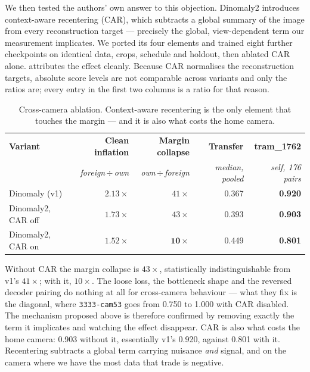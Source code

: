 We then tested the authors' own answer to this objection. Dinomaly2
\cite{Guo_2025_dinomaly2} introduces context-aware recentering (CAR), which
subtracts a global summary of the image from every reconstruction target ---
precisely the global, view-dependent term our measurement implicates. We ported
its four elements and trained eight further checkpoints on identical data,
crops, schedule and holdout, then ablated CAR alone.
 attributes the effect cleanly. Because CAR normalises
the reconstruction targets, absolute score levels are not comparable across
variants and only the ratios are; every entry in the first two columns is a
ratio for that reason.

\begin{table}[t]
\centering
\caption{Cross-camera ablation. Context-aware recentering is the only element
that touches the margin --- and it is also what costs the home camera.}
\label{tab:dinomaly2}
\begin{tabular}{@{}lrrrr@{}}
\toprule
\textbf{Variant} & \textbf{Clean inflation} & \textbf{Margin collapse} &
\textbf{Transfer} & \textbf{tram\_1762} \\
 & \emph{foreign\,$\div$\,own} & \emph{own\,$\div$\,foreign} &
 \emph{median, pooled} & \emph{self, 176 pairs} \\
\midrule
Dinomaly (v1)          & $2.13\times$ & $41\times$ & 0.367 & \textbf{0.920} \\
Dinomaly2, CAR off     & $1.73\times$ & $43\times$ & 0.393 & \textbf{0.903} \\
Dinomaly2, CAR on      & $\mathbf{1.52\times}$ & $\mathbf{10\times}$ & 0.449 & \textbf{0.801} \\
\bottomrule
\end{tabular}
\end{table}

Without CAR the margin collapse is $43\times$, statistically indistinguishable
from v1's $41\times$; with it, $10\times$. The loose loss, the bottleneck shape
and the reversed decoder pairing do nothing at all for cross-camera behaviour
--- what they fix is the diagonal, where \texttt{3333-cam53} goes from 0.750 to
1.000 with CAR disabled. The mechanism proposed above is therefore confirmed by
removing exactly the term it implicates and watching the effect disappear. CAR
is also what costs the home camera: 0.903 without it, essentially v1's 0.920,
against 0.801 with it. Recentering subtracts a global term carrying nuisance
\emph{and} signal, and on the camera where we have the most data that trade is
negative.


